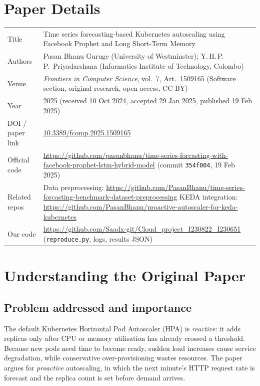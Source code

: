 \documentclass[11pt,a4paper]{article}
\begin{document}
\section{Paper Details}
\begin{table}[h]\centering\small
\begin{tabularx}{\textwidth}{@{}lL@{}}\toprule
Title & Time series forecasting-based Kubernetes autoscaling using Facebook Prophet and Long Short-Term Memory \\
Authors & Pasan Bhanu Guruge (University of Westminster); Y.\,H.\,P.\,P.\ Priyadarshana (Informatics Institute of Technology, Colombo) \\
Venue & \textit{Frontiers in Computer Science}, vol.\ 7, Art.\ 1509165 (Software section, original research, open access, CC BY) \\
Year & 2025 (received 10 Oct 2024, accepted 29 Jan 2025, published 19 Feb 2025) \\
DOI / paper link & \href{https://doi.org/10.3389/fcomp.2025.1509165}{10.3389/fcomp.2025.1509165} \\
Official code & \url{https://github.com/pasanbhanu/time-series-forcasting-with-facebook-prophet-lstm-hybrid-model} (commit \texttt{354f004}, 19 Feb 2025) \\
Related repos & Data preprocessing: \url{https://github.com/PasanBhanu/time-series-forcasting-benchmark-dataset-preprocessing}\newline
KEDA integration: \url{https://github.com/PasanBhanu/proactive-autoscaler-for-keda-kubernetes} \\
Our code & \url{https://github.com/Saadx-git/Cloud_project_I230822_I230651} (\texttt{reproduce.py}, logs, results JSON) \\
\bottomrule\end{tabularx}
\end{table}

\section{Understanding the Original Paper}
\subsection{Problem addressed and importance}
The default Kubernetes Horizontal Pod Autoscaler (HPA) is \emph{reactive}: it adds replicas only after CPU or memory utilisation has already crossed a threshold. Because new pods need time to become ready, sudden load increases cause service degradation, while conservative over-provisioning wastes resources. The paper argues for \emph{proactive} autoscaling, in which the next minute's HTTP request rate is forecast and the replica count is set before demand arrives.
\end{document}

